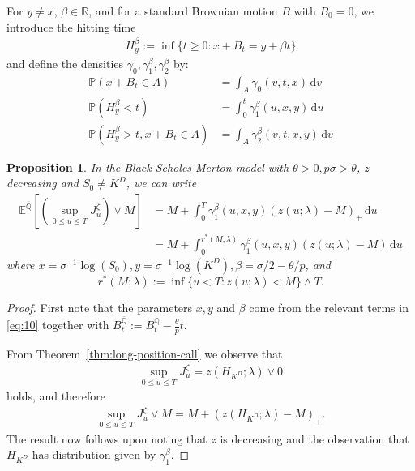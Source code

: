 \documentclass[a4paper]{amsart}
\newtheorem{proposition}[theorem]{Proposition}
\theoremstyle{definition}
\theoremstyle{remark}
\numberwithin{equation}{section}
\newcommand{\E}{\mathbb{E}}
\renewcommand{\P}{\mathbb{P}}
\newcommand{\Q}{\mathbb{Q}}
\newcommand{\di}{\mathrm{d}}
\newcommand{\R}{\mathbb{R}}
\newcommand{\Ebq}[1]{\E^{\bQ}\left[#1\right]}
\newcommand{\ol}{\overline}
\newcommand{\bQ}{\ol{\mathbb{Q}}}
\begin{document}
For $y \neq x$, $\beta \in \R$, and for a standard Brownian motion $B$ with $B_0 = 0$, we introduce the hitting time
\begin{align*}
  H_{y}^{\beta} := \inf \{ t \ge 0 :  x+ B_t = y + \beta t\}
\end{align*}
and define the densities $\gamma_0, \gamma_1^\beta, \gamma_2^\beta$ by:
\begin{align}
  \P(x+ B_t \in A) & = \int_A \gamma_0(v,t,x) \, \di v \nonumber\\
  \label{eq:BrownianHittingLine}
  \P(H_y^\beta < t) & = \int_0^t \gamma_1^\beta(u,x,y) \, \di u\\
  \P(H_y^\beta > t, x+ B_t \in A)  & = \int_A \gamma_2^\beta(v,t,x,y) \, \di v
                                  \label{eq:BrownianNotHitting}
\end{align}

\begin{proposition} \label{prop:BSM_M}
  In the Black-Scholes-Merton model with $\theta >0, p \sigma > \theta$, $z$ decreasing and $S_0 \neq K^D$, we can write 
  \begin{align}
   \Ebq{\left( \sup_{0 \le u \le T} J_u^\zeta\right) \vee M}
    & = M + \int_0^T \gamma_1^\beta(u,x,y)  (z(u; \lambda) - M)_+  \, \di u \nonumber
    \\
    & = M + \int_0^{r^*(M;\lambda)} \gamma_1^\beta(u,x,y)  (z(u; \lambda) - M) \, \di u
    \label{eq:12}
  \end{align}
  where $x = \sigma^{-1} \log(S_0), y = \sigma^{-1} \log(K^D), \beta = \sigma/2-\theta/p$, and
  \begin{equation*}
    r^*(M;\lambda) := \inf\{ u < T : z(u; \lambda) < M\} \wedge T.
  \end{equation*}
\end{proposition}

\begin{proof}
  First note that the parameters $x, y$ and $\beta$ come from the relevant terms in \eqref{eq:10} together with $B_t^{\bQ} := B_t^\Q - \frac{\theta}{p} t$.
  
  From Theorem~\ref{thm:long-position-call} we observe that
  \begin{align*}
    \sup_{0 \le u \le T} J_u^\zeta = z(H_{K^D};\lambda) \vee 0
  \end{align*}
  holds, and therefore 
  \begin{align*}
    \sup_{0 \le u \le T} J_u^\zeta \vee M = M + (z(H_{K^D};\lambda) - M)_+.
  \end{align*}
  The result now follows upon noting that $z$ is decreasing and the observation that $H_{K^D}$ has distribution given by $\gamma_1^\beta$.
\end{proof}
\end{document}
